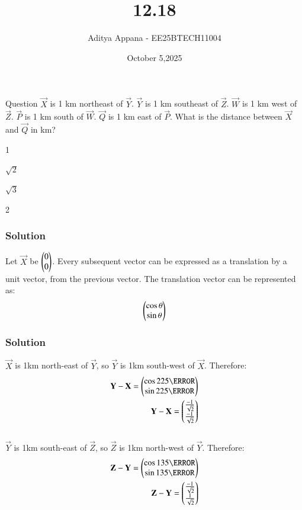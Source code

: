 \documentclass{beamer}
\title %
{12.18}
\date{October 5,2025}
\author %
{Aditya Appana - EE25BTECH11004}
\begin{document}
\frame{\titlepage}
\begin{frame}{Question}
$\vec{X}$ is 1 km northeast of $\vec{Y}$. $\vec{Y}$ is 1 km southeast of $\vec{Z}$. $\vec{W}$ is 1 km west of $\vec{Z}$. $\vec{P}$ is 1
km south of $\vec{W}$. $\vec{Q}$ is 1 km east of $\vec{P}$. What is the distance between $\vec{X}$ and $\vec{Q}$ in km?
\begin{enumerate}
\begin{multicols}{4}
    \item 1
    \item $\sqrt{2}$
    \item $\sqrt{3}$
    \item 2
\end{multicols}
\end{enumerate}
\end{frame}



\begin{frame}[fragile]
    \frametitle{Solution}
Let $\vec{X}$ be $\begin{pmatrix}0\\0\end{pmatrix}$. Every subsequent vector can be expressed as a translation by a unit vector, from the previous vector. The translation vector can be represented as:\\
\begin{align}
\begin{pmatrix}\cos\theta \\ \sin\theta\end{pmatrix}
\end{align}
\end{frame}


\begin{frame}[fragile]
    \frametitle{Solution}
$\vec{X}$ is 1km north-east of $\vec{Y}$, so $\vec{Y}$ is 1km south-west of $\vec{X}$. Therefore:\begin{align}
\vec{Y}-\vec{X} = \myvec{\cos225\degree \\ \sin225\degree}\\
\vec{Y}-\vec{X} = \myvec{\frac{-1}{\sqrt{2}}\\\frac{-1}{\sqrt{2}}}
\end{align}\\
$\vec{Y}$ is 1km south-east of $\vec{Z}$, so $\vec{Z}$ is 1km north-west of $\vec{Y}$. Therefore:\begin{align}
\vec{Z}-\vec{Y} = \myvec{\cos135\degree \\ \sin135\degree}\\
\vec{Z}-\vec{Y} = \myvec{\frac{-1}{\sqrt{2}}\\\frac{1}{\sqrt{2}}}
\end{align}\\
\end{frame}
\end{document}
